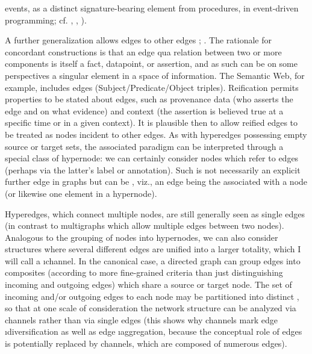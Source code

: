 {\begin{description}
events, as a distinct signature-bearing element from 
procedures, in event-driven programming; 
cf. \cite{JenniferPaykin}, 
\cite{PaykinKrishnaswami}, \cite{WolfgangJeltsch}). 
\item[Edges Incident to Edges]  A further generalization 
allows edges to  other edges 
\cite[p. 10]{BalintMolnar}; \cite[p. 13]{BenGoertzel}.
The rationale for concordant constructions is that 
an edge \mdash{} qua relation between two or more 
components \mdash{} is itself a fact, datapoint, or 
assertion, and as such can be on some perspectives a 
singular element in a space of information.  
The Semantic Web, for example, includes  
edges (Subject/Predicate/Object triples).  
Reification permits properties to be stated about edges, 
such as provenance data (who asserts the edge and on 
what evidence) and context (the assertion is believed true 
at a specific time or in a given context).  
It is plausible then to allow reified edges 
to be treated as nodes incident to other edges.  As 
with hyperedges possessing empty source or target 
sets, the associated paradigm can be interpreted through 
a special class of hypernode: we can certainly 
consider nodes which refer to edges (perhaps via the 
latter's label or annotation).  Such  
is not necessarily an explicit further edge in graphs 
but can be , viz., an edge being the 
 associated with a node (or likewise 
one element in a hypernode).
\item[Channels]   Hyperedges, which connect multiple 
nodes, are still generally seen as single edges 
(in contrast to multigraphs which allow multiple 
edges between two nodes).  Analogous to the grouping 
of nodes into hypernodes, we can also consider structures 
where several different edges are unified into a larger 
totality, which I will call a \i{channel}.  
In the canonical case, a directed graph can group 
edges into composites (according to more fine-grained criteria 
than just distinguishing incoming and outgoing edges) which share a 
source or target node.  The set of incoming and/or outgoing  edges 
to each node may be partitioned into distinct 
, so that at one scale of consideration the network 
structure can be analyzed via channels rather than via 
single edges (this shows why channels mark edge \i{diversification} 
as well as edge \i{aggregation}, because the conceptual role 
of edges is potentially replaced by channels, which are composed 
of numerous edges).
\\\hspace*{1em}

\end{description}}
